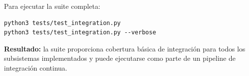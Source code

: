 Para ejecutar la suite completa:

\begin{verbatim}
python3 tests/test_integration.py
python3 tests/test_integration.py --verbose
\end{verbatim}

\textbf{Resultado:} la suite proporciona cobertura básica de integración para todos los subsistemas implementados y puede ejecutarse como parte de un pipeline de integración continua.

%
%
%
%
%
%
%
